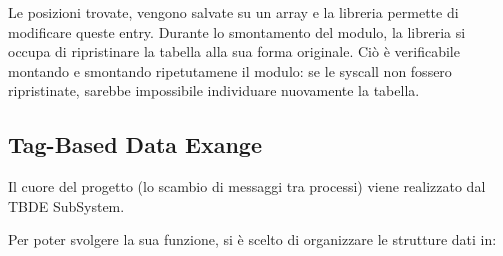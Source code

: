 Le posizioni trovate, vengono salvate su un array e la libreria permette di modificare queste entry.
Durante lo smontamento del modulo, la libreria si occupa di ripristinare la tabella alla sua forma originale.
Ciò è verificabile montando e smontando ripetutamene il modulo: se le syscall non fossero ripristinate, sarebbe
impossibile individuare nuovamente la tabella.
\newpage


\subsection{Tag-Based Data Exange} \label{tbde}

Il cuore del progetto (lo scambio di messaggi tra processi) viene realizzato dal TBDE SubSystem.

Per poter svolgere la sua funzione, si è scelto di organizzare le strutture dati in:
